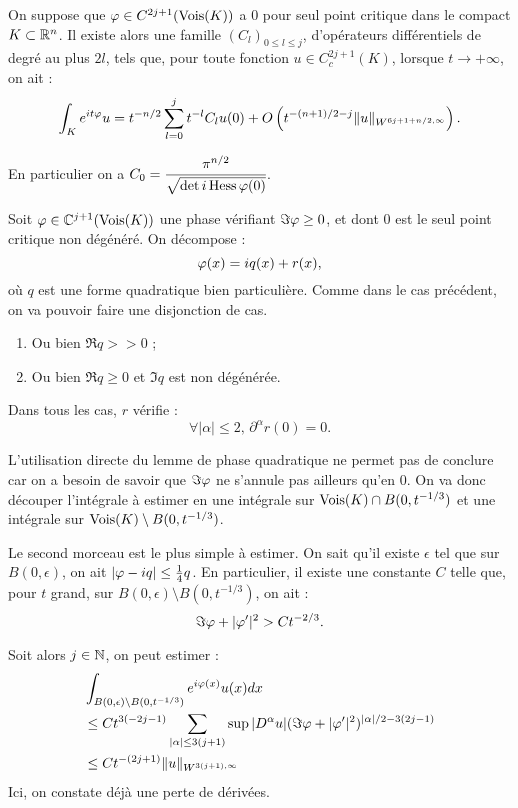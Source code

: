 \begin{prop}\label{prop:phasestat}On suppose que $\varphi \in C^{2j+1}(\operatorname{Vois}(K))$ a $0$ pour seul point critique dans le compact $K \subset \mathbb{R}^n$.
Il existe alors une famille $(C_l)_{0 \leq l \leq j}$, d'opérateurs différentiels de degré au plus $2l$, tels que, pour toute fonction $u\in C_c^{2j+1}(K)$, lorsque $t\to +\infty$, on ait :
\begin{equation*}
  \int_Ke^{it\varphi}u = t^{-n/2}\sum_{l=0}^{j}t^{-l}C_lu(0) + O\left(t^{-(n+1)/2-j}\|u\|_{W^{6j+1+n/2,\infty}}\right).
\end{equation*}

En particulier on a $C_0 = \cfrac{\pi^{n/2}}{\sqrt{\det i\operatorname{Hess}{\varphi}(0)}}$.
\end{prop}
\begin{preuve}
Soit $\varphi \in \mathbb{C}^{j+1}(\operatorname{Vois}(K))$ une phase vérifiant $\Im \varphi \geq 0$, et dont $0$ est le seul point critique non dégénéré. On décompose :
\begin{equation*}
\varphi(x) = iq(x)+r(x),
\end{equation*}
\noindent où $q$ est une forme quadratique bien particulière. Comme dans le cas précédent, on va pouvoir faire une disjonction de cas.
\begin{enumerate} \item Ou bien $\Re q >>0$ ;
 \item Ou bien $\Re q \geq 0$ et $\Im q$ est non dégénérée. 
\end{enumerate}
Dans tous les cas, $r$ vérifie :
\begin{equation*}
\forall |\alpha| \leq 2,\, \partial^{\alpha}r(0)=0.
\end{equation*}

L'utilisation directe du lemme de phase quadratique ne permet pas de conclure car on a besoin de savoir que $\Im \varphi$ ne s'annule pas ailleurs qu'en 0. On va donc découper l'intégrale à estimer en une intégrale sur $\operatorname{Vois}(K) \cap B(0,t^{-1/3})$ et une intégrale sur $\operatorname{Vois}(K) \setminus B(0,t^{-1/3})$.

Le second morceau est le plus simple à estimer. On sait qu'il existe $\epsilon$ tel que sur $B(0,\epsilon)$, on ait $|\varphi-iq|\leq \frac 14 q$. En particulier, il existe une constante $C$ telle que, pour $t$ grand, sur $B(0,\epsilon)\setminus B(0,t^{-1/3})$, on ait :
\begin{equation*}
  \Im\varphi + |\varphi'|^2 > Ct^{-2/3}.
\end{equation*}

Soit alors $j\in \mathbb{N}$, on peut estimer :
\begin{align*}
&\int_{B(0,\epsilon) \setminus B(0,t^{-1/3})}e^{i\varphi(x)}u(x)dx \\
&\leq C t^{3(-2j-1)}\sum_{|\alpha| \leq 3(j+1)}\sup|D^{\alpha}u|(\Im \varphi + |\varphi'|^2)^{|\alpha|/2-3(2j-1)}\\
&\leq Ct^{-(2j+1)}\|u\|_{W^{3(j+1),\infty}}
\end{align*}
Ici, on constate déjà une perte de dérivées.


\end{preuve}
